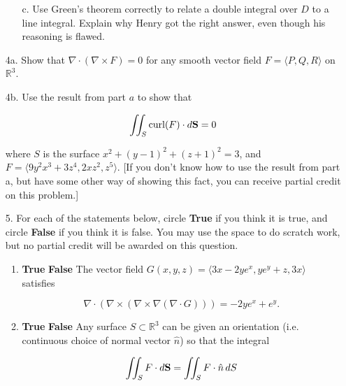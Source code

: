 \documentclass[12 pt]{report}
\begin{document}
\begin{enumerate}
\begin{enumerate}
\item[c.] Use Green's theorem correctly to relate a double integral over $D$ to a line integral. Explain why Henry got the right answer, even though his reasoning is flawed. 



\end{enumerate} 

\newpage

\item[4a.] Show that $\nabla \cdot (\nabla \times F) = 0$ for any smooth vector field $F = \langle P, Q, R \rangle$ on $\mathbb{R}^3$.  

\vspace{10cm}

\item[4b.] Use the result from part $a$ to show that 

$$\iint_S \text{curl}(F) \cdot d\bold{S} = 0$$ 

where $S$ is the surface $x^2 + (y-1)^2 + (z+1)^2 = 3$, and $F = \langle 9y^2 x^3+3z^4, 2xz^2, z^5 \rangle$. [If you don't know how to use the result from part a, but have some other way of showing this fact, you can receive partial credit on this problem.]

\newpage

\item[5.] For each of the statements below, circle \textbf{True} if you think it is true, and circle \textbf{False} if you think it is false. You may use the space to do scratch work, but no partial credit will be awarded on this question. 

\begin{enumerate} 
\item \textbf{True} \hspace{5pt} \textbf{False} \hspace{10pt} The vector field $G(x,y,z) = \langle 3x - 2y e^x, ye^y+z, 3x \rangle$ satisfies 

\[
\nabla \cdot (\nabla \times (\nabla \times \nabla(\nabla \cdot G))) = -2ye^x+e^y.
\]

\vfill

\item \textbf{True} \hspace{5pt} \textbf{False} \hspace{10pt} Any surface $S \subset \mathbb{R}^3$ can be given an orientation (i.e. continuous choice of normal vector $\hat{n}$) so that the integral 

\[
\iint_S F \cdot d\bold{S} = \iint_S F \cdot \hat{n} \, dS
\]


\end{enumerate}
\end{enumerate}
\end{document}
